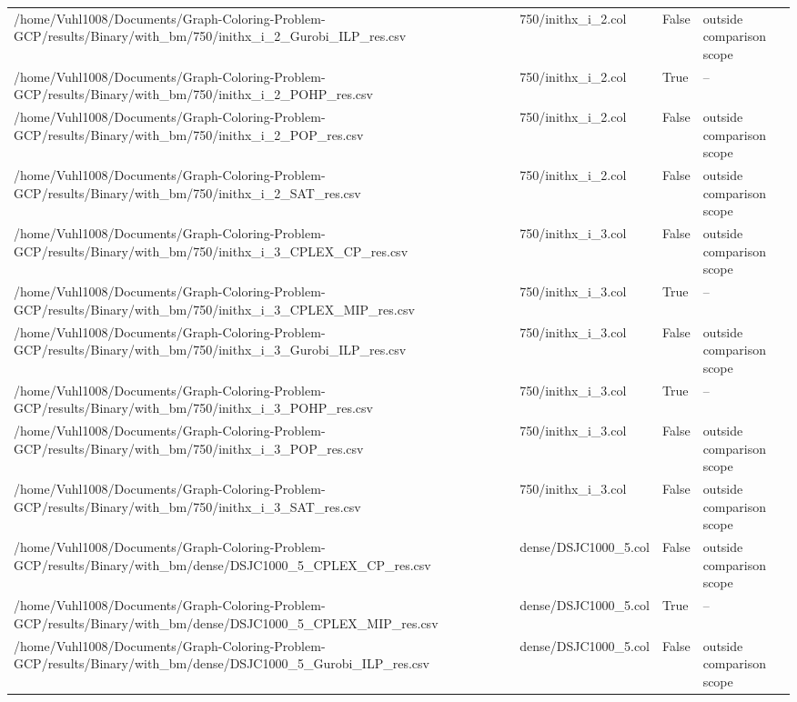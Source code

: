 \begin{table}[htbp]
\begin{tabular}{llll}
/home/Vuhl1008/Documents/Graph-Coloring-Problem-GCP/results/Binary/with\_bm/750/inithx\_i\_2\_Gurobi\_ILP\_res.csv & 750/inithx\_i\_2.col & False & outside comparison scope \\
/home/Vuhl1008/Documents/Graph-Coloring-Problem-GCP/results/Binary/with\_bm/750/inithx\_i\_2\_POHP\_res.csv & 750/inithx\_i\_2.col & True & -- \\
/home/Vuhl1008/Documents/Graph-Coloring-Problem-GCP/results/Binary/with\_bm/750/inithx\_i\_2\_POP\_res.csv & 750/inithx\_i\_2.col & False & outside comparison scope \\
/home/Vuhl1008/Documents/Graph-Coloring-Problem-GCP/results/Binary/with\_bm/750/inithx\_i\_2\_SAT\_res.csv & 750/inithx\_i\_2.col & False & outside comparison scope \\
/home/Vuhl1008/Documents/Graph-Coloring-Problem-GCP/results/Binary/with\_bm/750/inithx\_i\_3\_CPLEX\_CP\_res.csv & 750/inithx\_i\_3.col & False & outside comparison scope \\
/home/Vuhl1008/Documents/Graph-Coloring-Problem-GCP/results/Binary/with\_bm/750/inithx\_i\_3\_CPLEX\_MIP\_res.csv & 750/inithx\_i\_3.col & True & -- \\
/home/Vuhl1008/Documents/Graph-Coloring-Problem-GCP/results/Binary/with\_bm/750/inithx\_i\_3\_Gurobi\_ILP\_res.csv & 750/inithx\_i\_3.col & False & outside comparison scope \\
/home/Vuhl1008/Documents/Graph-Coloring-Problem-GCP/results/Binary/with\_bm/750/inithx\_i\_3\_POHP\_res.csv & 750/inithx\_i\_3.col & True & -- \\
/home/Vuhl1008/Documents/Graph-Coloring-Problem-GCP/results/Binary/with\_bm/750/inithx\_i\_3\_POP\_res.csv & 750/inithx\_i\_3.col & False & outside comparison scope \\
/home/Vuhl1008/Documents/Graph-Coloring-Problem-GCP/results/Binary/with\_bm/750/inithx\_i\_3\_SAT\_res.csv & 750/inithx\_i\_3.col & False & outside comparison scope \\
/home/Vuhl1008/Documents/Graph-Coloring-Problem-GCP/results/Binary/with\_bm/dense/DSJC1000\_5\_CPLEX\_CP\_res.csv & dense/DSJC1000\_5.col & False & outside comparison scope \\
/home/Vuhl1008/Documents/Graph-Coloring-Problem-GCP/results/Binary/with\_bm/dense/DSJC1000\_5\_CPLEX\_MIP\_res.csv & dense/DSJC1000\_5.col & True & -- \\
/home/Vuhl1008/Documents/Graph-Coloring-Problem-GCP/results/Binary/with\_bm/dense/DSJC1000\_5\_Gurobi\_ILP\_res.csv & dense/DSJC1000\_5.col & False & outside comparison scope \\

\end{tabular}
\end{table}
